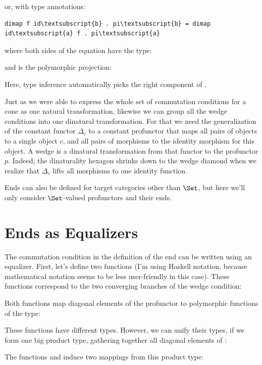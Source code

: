 or, with type annotations:

\begin{Verbatim}[commandchars=\\\{\}]
dimap f id\textsubscript{b} . pi\textsubscript{b} = dimap id\textsubscript{a} f . pi\textsubscript{a}
\end{Verbatim}
where both sides of the equation have the type:

and  is the polymorphic projection:

Here, type inference automatically picks the right component of
.

Just as we were able to express the whole set of commutation conditions
for a cone as one natural transformation, likewise we can group all the
wedge conditions into one dinatural transformation. For that we need the
generalization of the constant functor $\Delta_c$ to a constant
profunctor that maps all pairs of objects to a single object $c$,
and all pairs of morphisms to the identity morphism for this object. A
wedge is a dinatural transformation from that functor to the profunctor
$p$. Indeed, the dinaturality hexagon shrinks down to the wedge
diamond when we realize that $\Delta_c$ lifts all morphisms to one
identity function.

Ends can also be defined for target categories other than $\Set$,
but here we'll only consider $\Set$-valued profunctors and their
ends.

\section{Ends as Equalizers}

The commutation condition in the definition of the end can be written
using an equalizer. First, let's define two functions (I'm using Haskell
notation, because mathematical notation seems to be less user-friendly
in this case). These functions correspond to the two converging branches
of the wedge condition:

Both functions map diagonal elements of the profunctor  to
polymorphic functions of the type:

These functions have different types. However, we can unify their types,
if we form one big product type, gathering together all diagonal
elements of :

The functions  and  induce two mappings from
this product type:

